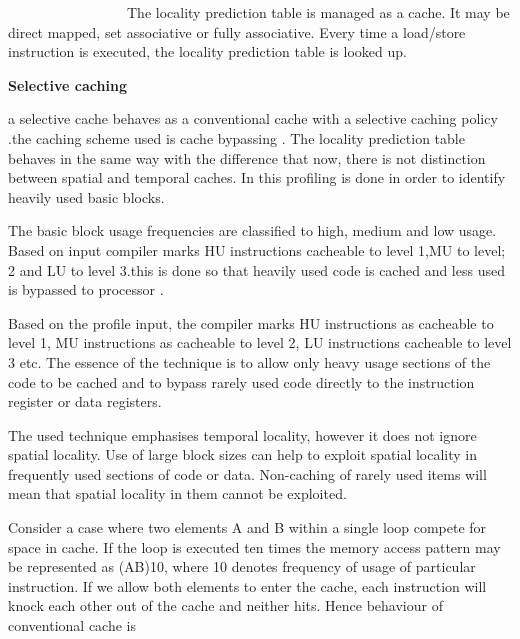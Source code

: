 \documentclass[12pt]{article}
\begin{document}
{\fontsize{10pt}{12.0pt}\selectfont \ \ \ \ \ \ \ \ \ \ \ \ \ \ \ \ \  The locality prediction table is managed as a cache. It may be direct mapped, set associative or fully associative. Every time a load/store instruction is executed, the locality prediction table is looked up.\par}\par


\vspace{\baselineskip}
\setlength{\parskip}{8.04pt}
{\fontsize{16pt}{19.2pt}\selectfont \textbf{Selective caching }\par}\par

{\fontsize{10pt}{12.0pt}\selectfont a selective cache behaves as a conventional cache with a selective caching policy .the caching scheme used is cache bypassing . The locality prediction table behaves in the same way with the difference that now, there is not distinction between spatial and temporal caches. In this profiling is done in order to identify heavily used basic blocks.\par}\par

{\fontsize{10pt}{12.0pt}\selectfont The basic block usage frequencies are classified to high, medium and low usage. Based on input compiler marks HU instructions cacheable to level 1,MU to level; 2 and LU to level 3.this is done so that heavily used code is cached and less used is bypassed to processor .\par} {\fontsize{10pt}{12.0pt}\selectfont Based on the profile input, the compiler marks HU instructions as cacheable to level 1, MU instructions as cacheable to level 2, LU instructions cacheable to level 3 etc. The essence of the technique is to allow only heavy usage sections of the code to be cached and to bypass rarely used code directly to the instruction register or data registers.\par}\par

{\fontsize{10pt}{12.0pt}\selectfont The used technique emphasises temporal locality, however it does not ignore spatial locality. Use of large block sizes can help to exploit spatial locality in frequently used sections of code or data. Non-caching of rarely used items will mean that spatial locality in them cannot be exploited.\par}\par

{\fontsize{10pt}{12.0pt}\selectfont Consider a case where two elements A and B within a single loop compete for space in cache. If the loop is executed ten times the memory access pattern may be represented as (AB)10, where 10 denotes frequency of usage of particular instruction. If we allow both elements to enter the cache, each instruction will knock each other out of the cache and neither hits. Hence behaviour of conventional cache is \par}\par
\end{document}
